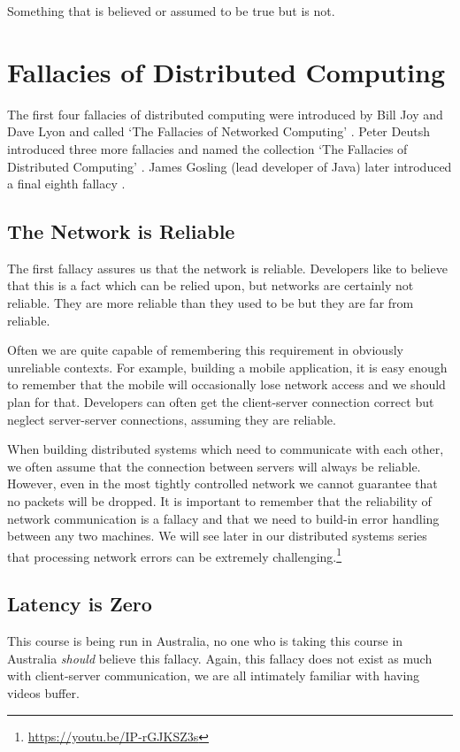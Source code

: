 \begin{definition}[Fallacy]
Something that is believed or assumed to be true but is not.
\end{definition}

\section{Fallacies of Distributed Computing}
The first four fallacies of distributed computing were introduced by Bill Joy and Dave Lyon and called `The Fallacies of Networked Computing' \cite{four-fallacies}.
Peter Deutsh introduced three more fallacies and named the collection `The Fallacies of Distributed Computing' \cite{eight-fallacies}.
James Gosling (lead developer of Java) later introduced a final eighth fallacy \cite{four-fallacies}.

\subsection{The Network is Reliable}
The first fallacy assures us that the network is reliable.
Developers like to believe that this is a fact which can be relied upon, but networks are certainly not reliable.
They are more reliable than they used to be but they are far from reliable.

Often we are quite capable of remembering this requirement in obviously unreliable contexts.
For example, building a mobile application,
it is easy enough to remember that the mobile will occasionally lose network access and we should plan for that.
Developers can often get the client-server connection correct but neglect server-server connections,
assuming they are reliable.

When building distributed systems which need to communicate with each other,
we often assume that the connection between servers will always be reliable.
However, even in the most tightly controlled network we cannot guarantee that no packets will be dropped.
It is important to remember that the reliability of network communication is a fallacy and that we need to build-in error handling between any two machines.
We will see later in our distributed systems series that processing network errors can be extremely challenging.\footnote{\url{https://youtu.be/IP-rGJKSZ3s}}

\subsection{Latency is Zero}
This course is being run in Australia,
no one who is taking this course in Australia \textsl{should} believe this fallacy.
Again, this fallacy does not exist as much with client-server communication,
we are all intimately familiar with having videos buffer.

